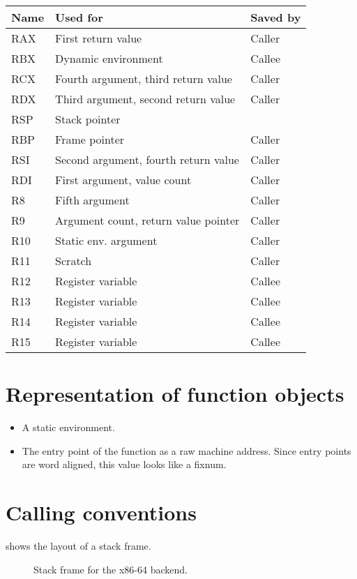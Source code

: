 \begin{tabular}{|l|l|l|}
\hline
Name & Used for & Saved by\\
\hline
\hline
RAX & First return value & Caller\\
RBX & Dynamic environment & Callee\\
RCX & Fourth argument, third return value & Caller \\
RDX & Third argument, second return value & Caller\\
RSP & Stack pointer &\\
RBP & Frame pointer & Caller\\
RSI & Second argument, fourth return value & Caller\\
RDI & First argument, value count & Caller\\
R8  & Fifth argument & Caller\\
R9  &  Argument count, return value pointer& Caller\\
R10 & Static env. argument & Caller\\
R11 & Scratch & Caller\\
R12 & Register variable & Callee\\
R13 & Register variable & Callee\\
R14 & Register variable & Callee\\
R15 & Register variable & Callee\\
\hline
\end{tabular}

\section{Representation of function objects}

\begin{itemize}
\item A static environment.
\item The entry point of the function as a raw machine address.  Since
  entry points are word aligned, this value looks like a fixnum.
\end{itemize}

\section{Calling conventions}

 shows the layout of a stack frame.

\begin{figure}
\begin{center}
\end{center}
\caption{\label{fig-x86-64-stack-frame}
Stack frame for the x86-64 backend.}
\end{figure}

